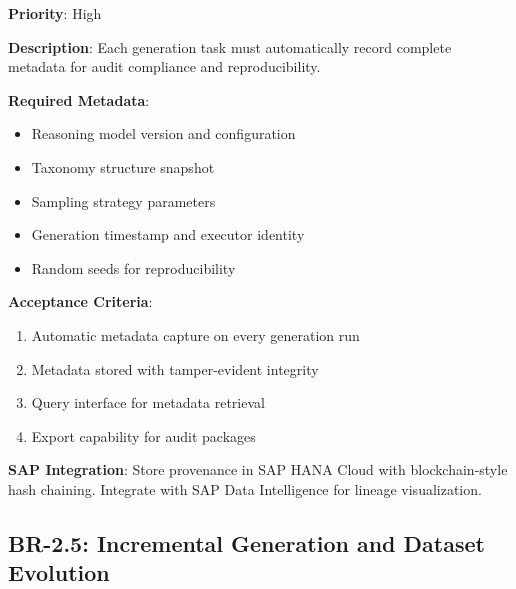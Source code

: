 \begin{tcolorbox}[colback=green!5,colframe=green!70,title=BR-2.4: Complete Metadata Capture]
\textbf{Priority}: High

\textbf{Description}: Each generation task must automatically record complete
metadata for audit compliance and reproducibility.

\textbf{Required Metadata}:
\begin{itemize}
  \item Reasoning model version and configuration
  \item Taxonomy structure snapshot
  \item Sampling strategy parameters
  \item Generation timestamp and executor identity
  \item Random seeds for reproducibility
\end{itemize}

\textbf{Acceptance Criteria}:
\begin{enumerate}
  \item Automatic metadata capture on every generation run
  \item Metadata stored with tamper-evident integrity
  \item Query interface for metadata retrieval
  \item Export capability for audit packages
\end{enumerate}

\textbf{SAP Integration}: Store provenance in SAP HANA Cloud with blockchain-style
hash chaining. Integrate with SAP Data Intelligence for lineage visualization.
\end{tcolorbox}

\subsection{BR-2.5: Incremental Generation and Dataset Evolution}

